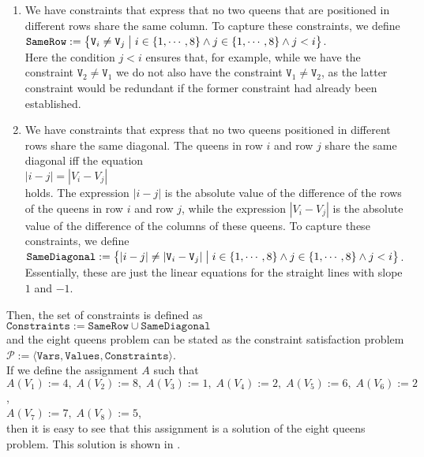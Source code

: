 \begin{enumerate}
\item We have constraints that express that no two queens that are positioned in different rows share the same
      column.  To capture these constraints, we define
      \\[0.2cm]
      \hspace*{1.3cm}
      $\texttt{SameRow} := \bigl\{ \texttt{V}_i \not= \texttt{V}_j \bigm| i \in \{1,\cdots,8\} \wedge j \in \{1,\cdots,8\} \wedge j < i \bigr\}$.
      \\[0.2cm]
      Here the condition $j < i$ ensures that, for example,  while we have the constraint
      $\texttt{V}_2 \not=
      \texttt{V}_1$ we do not also have the constraint  $\texttt{V}_1 \not= \texttt{V}_2$, as the latter 
      constraint would be redundant if the former constraint had already been established.
\item We have constraints that express that no two queens positioned in different rows share the same 
      diagonal.  The queens in row $i$ and row $j$ share the same diagonal iff the equation
      \\[0.2cm]
      \hspace*{1.3cm}
      $|i - j| = |V_i - V_j|$
      \\[0.2cm]
      holds.  The expression $|i-j|$ is the absolute value of the difference of the rows of the queens in row
      $i$ and row $j$,  while the expression $|V_i - V_j|$ is the absolute value of the difference of the
      columns of these queens.  To capture these constraints, we define
      \\[0.2cm]
      \hspace*{1.3cm}
      $\texttt{SameDiagonal} := \bigl\{ |i  - j| \not= |\texttt{V}_i - \texttt{V}_j| \bigm| i \in \{1,\cdots,8\} \wedge j \in \{1,\cdots,8\} \wedge j < i \bigr\}$.
      \\[0.2cm]
      Essentially, these are just the linear equations for the straight lines with slope $1$ and $-1$.
\end{enumerate}
Then, the set of constraints is defined as 
\\[0.2cm]
\hspace*{1.3cm}
$\texttt{Constraints} := \texttt{SameRow} \cup \texttt{SameDiagonal}$
\\[0.2cm]
and the eight queens problem can be stated as the constraint satisfaction problem
\\[0.2cm]
\hspace*{1.3cm}
$\mathcal{P} := \langle \texttt{Vars}, \texttt{Values}, \texttt{Constraints} \rangle$.
\\[0.2cm]
If we define the assignment $A$ such that
\\[0.2cm]
\hspace*{1.3cm}
$A(V_1) := 4,\; A(V_2) := 8,\; A(V_3) := 1,\; A(V_4) := 2,\; A(V_5) := 6,\; A(V_6) := 2$,
\\[0.2cm]
\hspace*{1.3cm}
$A(V_7) := 7,\; A(V_8) := 5$,
\\[0.2cm]
then it is easy to see that this assignment is a solution of the eight queens problem.  This solution is shown
in .


